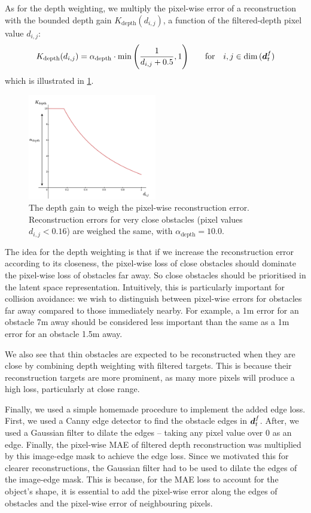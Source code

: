 As for the depth weighting, we multiply the pixel-wise error of a reconstruction with the bounded depth gain $K_{\text{depth}}(d_{i,j})$, a function of the filtered-depth pixel value $d_{i,j}$:
\begin{equation}
    K_{\text{depth}}(d_{i,j}) = \alpha_\text{depth} \cdot \min \Bigg(\frac{1}{d_{i,j} + 0.5}, 1\Bigg) \qquad \text{for} \quad  i, j \in \dim \, ({\boldsymbol{d}}_t^f)
\end{equation}
which is illustrated in \cref{fig:5_depth_gain}.
\begin{figure}[hbt]
    \centering
    \includegraphics[width=0.5\textwidth]{figures/5_/5_depth_gain.pdf}
    \caption{The depth gain to weigh the pixel-wise reconstruction error. Reconstruction errors for very close obstacles (pixel values $d_{i,j}<0.16$) are weighed the same, with $\alpha_\text{depth} = 10.0$.}
    \label{fig:5_depth_gain}
\end{figure}
The idea for the depth weighting is that if we increase the reconstruction error according to its closeness, the pixel-wise loss of close obstacles should dominate the pixel-wise loss of obstacles far away. So close obstacles should be prioritised in the latent space representation.
Intuitively, this is particularly important for collision avoidance: we wish to distinguish between pixel-wise errors for obstacles far away compared to those immediately nearby. For example, a 1m error for an obstacle 7m away should be considered less important than the same as a 1m error for an obstacle 1.5m away.

We also see that thin obstacles are expected to be reconstructed when they are close by combining depth weighting with filtered targets. This is because their reconstruction targets are more prominent, as many more pixels will produce a high loss, particularly at close range.

Finally, we used a simple homemade procedure to implement the added edge loss. First, we used a Canny edge detector \cite{canny_edge_detection} to find the obstacle edges in ${\boldsymbol{d}}_t^f$. After, we used a Gaussian filter to dilate the edges -- taking any pixel value over 0 as an edge. Finally, the pixel-wise MAE of filtered depth reconstruction was multiplied by this image-edge mask to achieve the edge loss. Since we motivated this for clearer reconstructions, the Gaussian filter had to be used to dilate the edges of the image-edge mask. This is because, for the MAE loss to account for the object's shape, it is essential to add the pixel-wise error along the edges of obstacles and the pixel-wise error of neighbouring pixels. 


